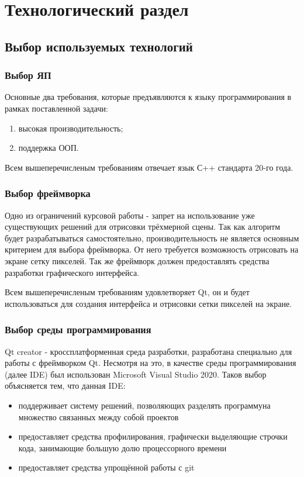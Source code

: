 \documentclass[a4paper, 14pt]{report} %
\begin{document}
	\chapter{Технологический раздел}
	\section{Выбор используемых технологий}
	\subsection{Выбор ЯП}
	Основные два требования, которые предъявляются к языку программирования в рамках поставленной задачи:
	\begin{enumerate}
		\item высокая производительность;
		\item поддержка ООП.
	\end{enumerate}

	Всем вышеперечисленым требованиям отвечает язык С++ стандарта 20-го года.
	
	\subsection{Выбор фреймворка}
	Одно из ограничений курсовой работы - запрет на использование уже существующих решений для отрисовки трёхмерной сцены. Так как алгоритм будет разрабатываться самостоятельно, производительность не является основным критерием для выбора фреймворка. От него требуется возможность отрисовать на экране сетку пикселей. Так же фреймворк должен предоставлять средства разработки графического интерфейса.
	
	Всем вышеперечисленым требованиям удовлетворяет Qt, он и будет использоваться для создания интерфейса и отрисовки сетки пикселей на экране.
	
	\subsection{Выбор среды программирования}
	Qt creator - кроссплатформенная среда разработки, разработана специально для работы с фреймворком Qt. Несмотря на это, в качестве среды программирования (далее IDE) был использован Microsoft Visual Studio 2020. Таков выбор объясняется тем, что данная IDE:
	
	\begin{itemize}
		\item поддерживает систему решений, позволяющих разделять программуна множество связанных между собой проектов
		\item предоставляет средства профилирования, графически выделяющие строчки кода, занимающие большую долю процессорного времени
		\item предоставляет средства упрощённой работы с git
	\end{itemize}
	
\end{document}
